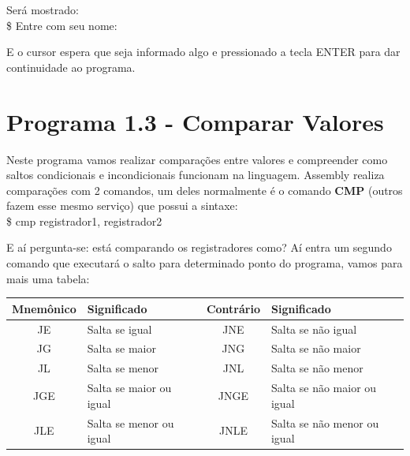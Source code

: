 Será mostrado: \\
{\ttfamily\$ Entre com seu nome:}

E o cursor espera que seja informado algo e pressionado a tecla ENTER para dar continuidade ao programa.

\section{Programa 1.3 - Comparar Valores}
Neste programa vamos realizar comparações entre valores e compreender como saltos condicionais e incondicionais funcionam na linguagem. Assembly realiza comparações com 2 comandos, um deles normalmente é o comando \textbf{CMP} (outros fazem esse mesmo serviço) que possui a sintaxe: \\
{\ttfamily\$ cmp registrador1, registrador2}

E aí pergunta-se: está comparando os registradores como? Aí entra um segundo comando que executará o salto para determinado ponto do programa, vamos para mais uma tabela:
\begin{table}[H]
	\centering 
	\begin{tabular}{c | l | c | l }
		\textbf{Mnemônico} & \textbf{Significado} & \textbf{Contrário} & \textbf{Significado} \\ \hline
		JE & Salta se igual & JNE & Salta se não igual \\
		JG & Salta se maior & JNG & Salta se não maior \\
		JL & Salta se menor & JNL & Salta se não menor \\
		JGE & Salta se maior ou igual & JNGE & Salta se não maior ou igual \\
		JLE & Salta se menor ou igual & JNLE & Salta se não menor ou igual \\
	\end{tabular}
\end{table}

